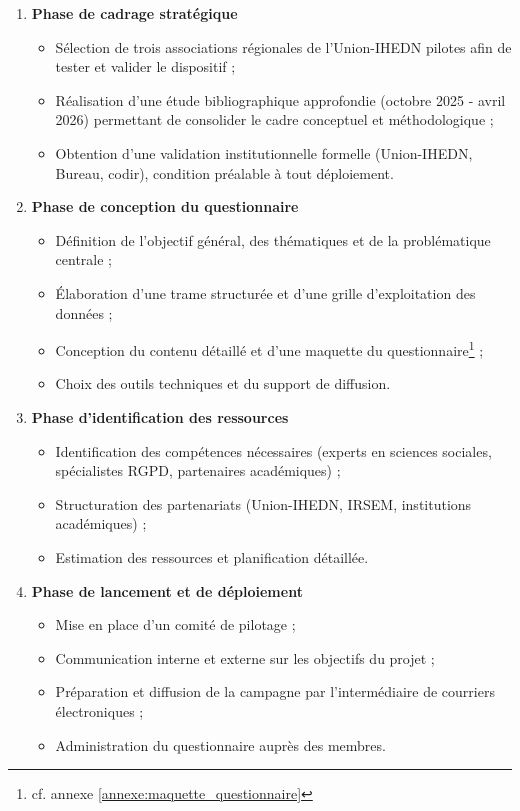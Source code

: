 \documentclass[12pt,a4paper]{article}
\newcommand{\UnionIHEDN}{Union-IHEDN}
\newcommand{\AssociationsRegionalesIHEDN}{associations régionales de l'\UnionIHEDN}
\begin{document}
\begin{enumerate}
    \item \textbf{Phase de cadrage stratégique}
    \begin{itemize}
        \item Sélection de trois \AssociationsRegionalesIHEDN{} pilotes afin de tester et valider le dispositif ;
        \item Réalisation d'une étude bibliographique approfondie (octobre 2025 - avril 2026) permettant de consolider le cadre conceptuel et méthodologique ;
        \item Obtention d'une validation institutionnelle formelle (\UnionIHEDN, Bureau, \acrshort{codir}), condition préalable à tout déploiement.
    \end{itemize}

    \item \textbf{Phase de conception du questionnaire}
    \begin{itemize}
        \item Définition de l'objectif général, des thématiques et de la problématique centrale ;
        \item Élaboration d'une trame structurée et d'une grille d'exploitation des données ;
        \item Conception du contenu détaillé et d'une maquette du questionnaire\footnote{cf. annexe \ref{annexe:maquette_questionnaire}} ;
        \item Choix des outils techniques et du support de diffusion.
    \end{itemize}

    \item \textbf{Phase d'identification des ressources}
    \begin{itemize}
        \item Identification des compétences nécessaires (experts en sciences sociales, spécialistes RGPD, partenaires académiques) ;
        \item Structuration des partenariats (\UnionIHEDN, IRSEM, institutions académiques) ;
        \item Estimation des ressources et planification détaillée.
    \end{itemize}

    \item \textbf{Phase de lancement et de déploiement}
    \begin{itemize}
        \item Mise en place d'un comité de pilotage ;
        \item Communication interne et externe sur les objectifs du projet ;
        \item Préparation et diffusion de la campagne par l'intermédiaire de courriers électroniques ;
        \item Administration du questionnaire auprès des membres.
    \end{itemize}


\end{enumerate}
\end{document}
